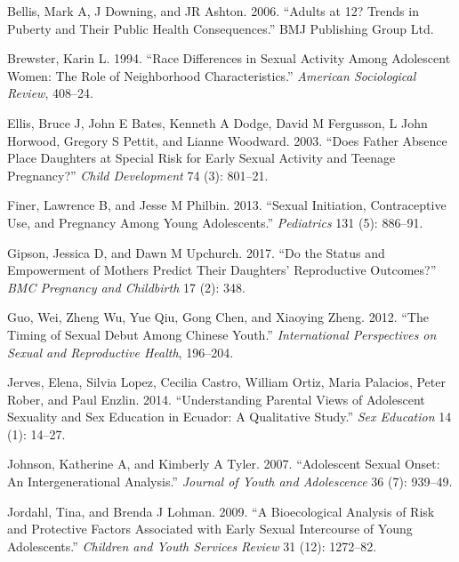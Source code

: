 \documentclass[
]{article}
\newlength{\cslhangindent}
\newenvironment{cslreferences}%
  {\setlength{\parindent}{0pt}%
  \everypar{\setlength{\hangindent}{\cslhangindent}}\ignorespaces}%
  {\par}
\begin{document}
\hypertarget{refs}{}
\begin{cslreferences}
\leavevmode\hypertarget{ref-bellis2006adults}{}%
Bellis, Mark A, J Downing, and JR Ashton. 2006. ``Adults at 12? Trends
in Puberty and Their Public Health Consequences.'' BMJ Publishing Group
Ltd.

\leavevmode\hypertarget{ref-brewster1994race}{}%
Brewster, Karin L. 1994. ``Race Differences in Sexual Activity Among
Adolescent Women: The Role of Neighborhood Characteristics.''
\emph{American Sociological Review}, 408--24.

\leavevmode\hypertarget{ref-ellis2003does}{}%
Ellis, Bruce J, John E Bates, Kenneth A Dodge, David M Fergusson, L John
Horwood, Gregory S Pettit, and Lianne Woodward. 2003. ``Does Father
Absence Place Daughters at Special Risk for Early Sexual Activity and
Teenage Pregnancy?'' \emph{Child Development} 74 (3): 801--21.

\leavevmode\hypertarget{ref-finer2013sexual}{}%
Finer, Lawrence B, and Jesse M Philbin. 2013. ``Sexual Initiation,
Contraceptive Use, and Pregnancy Among Young Adolescents.''
\emph{Pediatrics} 131 (5): 886--91.

\leavevmode\hypertarget{ref-gipson2017status}{}%
Gipson, Jessica D, and Dawn M Upchurch. 2017. ``Do the Status and
Empowerment of Mothers Predict Their Daughters' Reproductive Outcomes?''
\emph{BMC Pregnancy and Childbirth} 17 (2): 348.

\leavevmode\hypertarget{ref-guo2012timing}{}%
Guo, Wei, Zheng Wu, Yue Qiu, Gong Chen, and Xiaoying Zheng. 2012. ``The
Timing of Sexual Debut Among Chinese Youth.'' \emph{International
Perspectives on Sexual and Reproductive Health}, 196--204.

\leavevmode\hypertarget{ref-jerves2014understanding}{}%
Jerves, Elena, Silvia Lopez, Cecilia Castro, William Ortiz, Maria
Palacios, Peter Rober, and Paul Enzlin. 2014. ``Understanding Parental
Views of Adolescent Sexuality and Sex Education in Ecuador: A
Qualitative Study.'' \emph{Sex Education} 14 (1): 14--27.

\leavevmode\hypertarget{ref-johnson2007adolescent}{}%
Johnson, Katherine A, and Kimberly A Tyler. 2007. ``Adolescent Sexual
Onset: An Intergenerational Analysis.'' \emph{Journal of Youth and
Adolescence} 36 (7): 939--49.

\leavevmode\hypertarget{ref-jordahl2009bioecological}{}%
Jordahl, Tina, and Brenda J Lohman. 2009. ``A Bioecological Analysis of
Risk and Protective Factors Associated with Early Sexual Intercourse of
Young Adolescents.'' \emph{Children and Youth Services Review} 31 (12):
1272--82.


\end{cslreferences}
\end{document}
